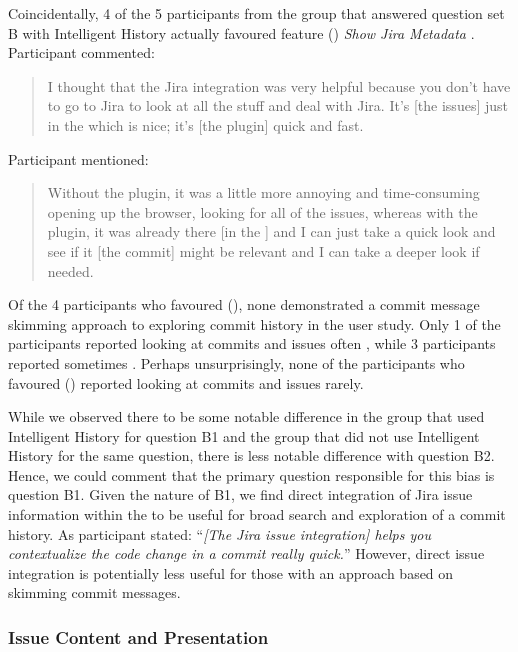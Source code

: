 Coincidentally, 4 of the 5 participants from the group that answered question set B with Intelligent History actually favoured feature () \textit{Show Jira Metadata} .
Participant  commented:

\begin{quote}
  I thought that the Jira integration was very helpful because you don’t have to go to Jira to look at all the stuff and deal with Jira. 
  It’s [the issues] just in the  which is nice; it’s [the plugin] quick and fast.
\end{quote}

Participant  mentioned:

\begin{quote}
  Without the plugin, it was a little more annoying and time-consuming opening up the browser, 
  looking for all of the issues, 
  whereas with the plugin, 
  it was already there [in the ] and I can just take a quick look and see if it [the commit] might be relevant and I can take a deeper look if needed.
\end{quote}

Of the 4 participants who favoured (), none demonstrated a commit message skimming approach to exploring commit history in the user study.
Only 1 of the participants reported looking at commits and issues often ,
while 3 participants reported sometimes .
Perhaps unsurprisingly, none of the participants who favoured () reported looking at commits and issues rarely.

While we observed there to be some notable difference in the group that used Intelligent History for question B1 and the group that did not use Intelligent History for the same question,
there is less notable difference with question B2.
Hence, we could comment that the primary question responsible for this bias is question B1.
Given the nature of B1, we find direct integration of Jira issue information within the  to be useful for broad search and exploration of a commit history.
As participant  stated:
``\textit{[The Jira issue integration] helps you contextualize the code change in a commit really quick.}''
However, direct issue integration is potentially less useful for those with an approach based on skimming commit messages.

\subsubsection{Issue Content and Presentation}

